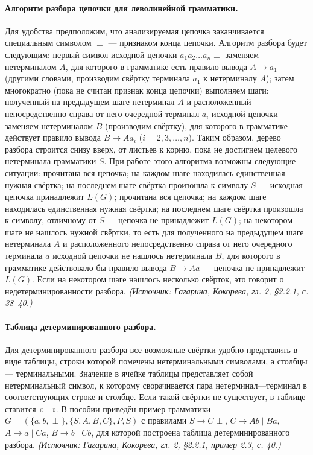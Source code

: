 \documentclass[a4paper,12pt]{article}
\begin{document}
\paragraph{Алгоритм разбора цепочки для леволинейной грамматики.}
Для удобства предположим, что анализируемая цепочка заканчивается специальным символом \(\perp\) — признаком конца цепочки. Алгоритм разбора будет следующим: первый символ исходной цепочки \(a_1a_2\ldots a_n\perp\) заменяем нетерминалом \(A\), для которого в грамматике есть правило вывода \(A\to a_1\) (другими словами, производим свёртку терминала \(a_1\) к нетерминалу \(A\)); затем многократно (пока не считан признак конца цепочки) выполняем шаги: полученный на предыдущем шаге нетерминал \(A\) и расположенный непосредственно справа от него очередной терминал \(a_i\) исходной цепочки заменяем нетерминалом \(B\) (производим свёртку), для которого в грамматике действует правило вывода \(B\to Aa_i\) (\(i=2,3,\ldots,n\)). Таким образом, дерево разбора строится снизу вверх, от листьев к корню, пока не достигнем целевого нетерминала грамматики \(S\). При работе этого алгоритма возможны следующие ситуации: прочитана вся цепочка; на каждом шаге находилась единственная нужная свёртка; на последнем шаге свёртка произошла к символу \(S\) — исходная цепочка принадлежит \(L(G)\); прочитана вся цепочка; на каждом шаге находилась единственная нужная свёртка; на последнем шаге свёртка произошла к символу, отличному от \(S\) — цепочка не принадлежит \(L(G)\); на некотором шаге не нашлось нужной свёртки, то есть для полученного на предыдущем шаге нетерминала \(A\) и расположенного непосредственно справа от него очередного терминала \(a\) исходной цепочки не нашлось нетерминала \(B\), для которого в грамматике действовало бы правило вывода \(B\to Aa\) — цепочка не принадлежит \(L(G)\). Если на некотором шаге нашлось несколько свёрток, это говорит о недетерминированности разбора.
\textit{(Источник: Гагарина, Кокорева, гл. 2, §2.2.1, с. 38--40.)}

\paragraph{Таблица детерминированного разбора.}
Для детерминированного разбора все возможные свёртки удобно представить в виде таблицы, строки которой помечены нетерминальными символами, а столбцы — терминальными. Значение в ячейке таблицы представляет собой нетерминальный символ, к которому сворачивается пара нетерминал—терминал в соответствующих строке и столбце. Если такой свёртки не существует, в таблице ставится «—». В пособии приведён пример грамматики \(G=(\{a,b,\perp\},\{S,A,B,C\},P,S)\) с правилами \(S\to C\perp\), \(C\to Ab\mid Ba\), \(A\to a\mid Ca\), \(B\to b\mid Cb\), для которой построена таблица детерминированного разбора.
\textit{(Источник: Гагарина, Кокорева, гл. 2, §2.2.1, пример 2.3, с. 40.)}
\end{document}
